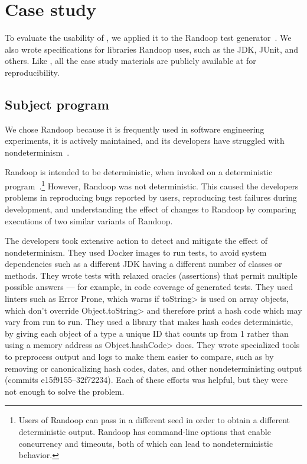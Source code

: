 \section{Case study}\label{sec:randoop-case-study}

To evaluate the usability of \theDeterminismChecker,
we applied it to the Randoop test
generator~\ifanonymous{}\else\cite{PachecoLEB2007}\fi.
We also wrote specifications for libraries Randoop uses, such as the JDK, JUnit,
and others.
Like \theDeterminismCheckerImplementation,
all the case study materials are publicly available at  for reproducibility.


\subsection{Subject program}\label{sec:subject-program}

We chose Randoop because 
it is frequently used in software engineering experiments,
it is actively maintained,
and its developers have struggled with nondeterminism~\cite{randoop-issue-tracker,randoop-mailing-lists}.

Randoop is intended to be deterministic, when invoked on a deterministic
program~\cite{randoop-manual}.\footnote{Users of Randoop can pass in a different seed in order to
  obtain a different deterministic output.  Randoop has command-line
  options that enable concurrency and timeouts, both of which can lead to
  nondeterministic behavior.}
However, Randoop was not deterministic.  This caused the developers
problems in 
reproducing bugs reported by users, 
reproducing test failures during development, and
understanding the effect of changes to Randoop by comparing executions of two
similar variants of Randoop.

The developers took extensive action to detect and mitigate the effect of nondeterminism.
They used Docker images to run tests, to avoid system dependencies such as
a different JDK having a different number of classes or methods.
They wrote tests with relaxed oracles (assertions) that permit multiple
possible answers --- for example, in code coverage of generated tests.
They used linters such as Error Prone, which warns if \<toString> is used on
array objects, which don't override \<Object.toString> and therefore print a
hash code which may vary from run to run.
They used a library that makes hash codes deterministic, by giving each
object of a type a unique ID that counts up from 1 rather than using a
memory address as \<Object.hashCode> does.
They wrote specialized tools to preprocess output and logs to make them easier
to compare, such as by removing or canonicalizing hash codes, dates, and
other nondeterministing output (commits e15f9155--32f72234).
Each of these efforts was helpful, but they were not enough to solve the problem.

